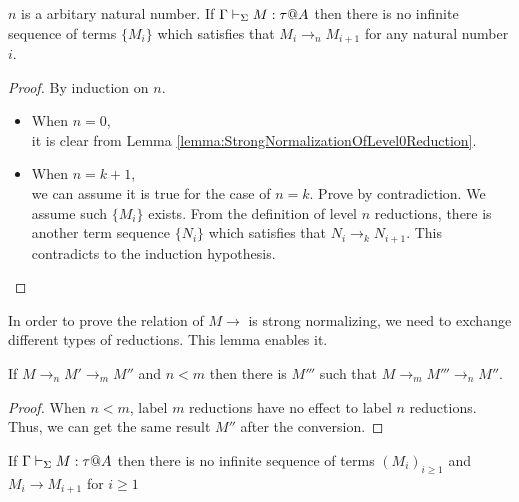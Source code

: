 \begin{lemma}
    \label{lemma:StrongNormalizationOfLevelnReduction}
    \( n \) is a arbitary natural number.
    If \( \G\V M:\tau@A \) then there is no infinite sequence of terms $\{M_i\}$ which satisfies that $M_i \longrightarrow_n M_{i+1}$ for any natural number \( i \).
\end{lemma}

\begin{proof}
    By induction on \( n \).
    \begin{itemize}
        \item When \( n = 0 \), \\
            it is clear from Lemma \ref{lemma:StrongNormalizationOfLevel0Reduction}.
        \item When \( n = k + 1 \), \\
            we can assume it is true for the case of \( n = k \).  Prove by
            contradiction. We assume such \(\{M_i\}\) exists. From the
            definition of level \( n \) reductions, there is another term
            sequence \( \{ N_i \} \) which satisfies that \( N_i
            \longrightarrow_k N_{i+1} \). This contradicts to the induction
            hypothesis.
    \end{itemize}
\end{proof}

In order to prove the relation of \( M \longrightarrow \) is strong
normalizing, we need to exchange different types of reductions. This lemma
enables it.

\begin{lemma}
    \label{lemma:CommutablityOfLeveledReductions}
    If \( M \longrightarrow_n M' \longrightarrow_m M'' \) and \( n < m \) then there is \( M''' \) such that \( M \longrightarrow_m M''' \longrightarrow_n M'' \).
\end{lemma}

\begin{proof}
    When \( n < m \), label \( m \)
    reductions have no effect to label \( n \) reductions. Thus, we can get the
    same result \( M'' \) after the conversion.
\end{proof}

\begin{theorem}
    \label{theorem:StrongNormalization}
    If \( \G\V M:\tau@A \) then there is no infinite sequence of terms $(M_i)_{i\ge1}$ and $M_i \longrightarrow M_{i+1}$ for $i\ge 1$
\end{theorem}

